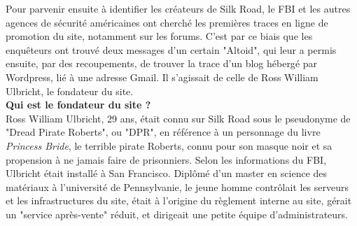 \documentclass[11pt,twoside,a4paper]{article}
\begin{document}
Pour parvenir ensuite {\`a} identifier les cr{\'e}ateurs de Silk Road, le FBI et les autres agences de s{\'e}curit{\'e} am{\'e}ricaines ont cherch{\'e} les premi{\`e}res traces en ligne de promotion du site, notamment sur les forums. C'est par ce biais que les enqu{\^e}teurs ont trouv{\'e} deux messages d'un certain "Altoid", qui leur a permis ensuite, par des recoupements, de trouver la trace d'un blog h{\'e}berg{\'e} par Wordpress, li{\'e} {\`a} une adresse Gmail. Il s'agissait de celle de Ross William Ulbricht, le fondateur du site. ~\\

	\textbf{Qui est le fondateur du site ?}~\\

Ross William Ulbricht, 29 ans, {\'e}tait connu sur Silk Road sous le pseudonyme de "Dread Pirate Roberts", ou "DPR", en r{\'e}f{\'e}rence {\`a} un personnage du livre \emph{Princess Bride}, le terrible pirate Roberts, connu pour son masque noir et sa propension {\`a} ne jamais faire de prisonniers. Selon les informations du FBI, Ulbricht {\'e}tait install{\'e} {\`a} San Francisco. Dipl{\^o}m{\'e} d'un master en science des mat{\'e}riaux {\`a} l'universit{\'e} de Pennsylvanie, le jeune homme contr{\^o}lait les serveurs et les infrastructures du site, {\'e}tait {\`a} l'origine du r{\`e}glement interne au site, g{\'e}rait un "service apr{\`e}s-vente" r{\'e}duit, et dirigeait une petite {\'e}quipe d'administrateurs. ~\\ 
\end{document}
